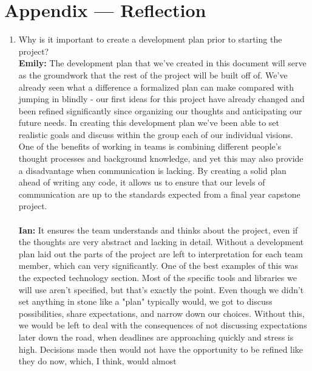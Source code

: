 \documentclass{article}
\begin{document}
\newpage{}

\section*{Appendix --- Reflection}



\begin{enumerate}
    \item Why is it important to create a development plan prior to starting the
    project?\\
    \textbf{Emily:} The development plan that we’ve created in this document will serve as the groundwork that the rest of the project will be built off of. 
                    We’ve already seen what a difference a formalized plan can make compared with jumping in blindly - our first ideas for this project have 
                    already changed and been refined significantly since organizing our thoughts and anticipating our future needs. In creating this development 
                    plan we’ve been able to set realistic goals and discuss within the group each of our individual visions. One of the benefits of working in 
                    teams is combining different people’s thought processes and background knowledge, and yet this may also provide a disadvantage when communication 
                    is lacking. By creating a solid plan ahead of writing any code, it allows us to ensure that our levels of communication are up to the standards 
                    expected from a final year capstone project. \\ \\
    \textbf{Ian:} It ensures the team understands and thinks about the project, even if the thoughts are very abstract and lacking in detail. Without a development plan laid
                    out the parts of the project are left to interpretation for each team member, which can very significantly. One of the best examples of this was the expected technology section. 
                    Most of the specific tools and libraries we will use aren't specified, but that’s exactly the point. Even though we didn't set anything in stone like a "plan" typically would, we 
                    got to discuss possibilities, share expectations, and narrow down our choices. Without this, we would be left to deal with the consequences of not discussing expectations later down 
                    the road, when deadlines are approaching quickly and stress is high. Decisions made then would not have the opportunity to be refined like they do now, which, I think, would almost 

\end{enumerate}
\end{document}
